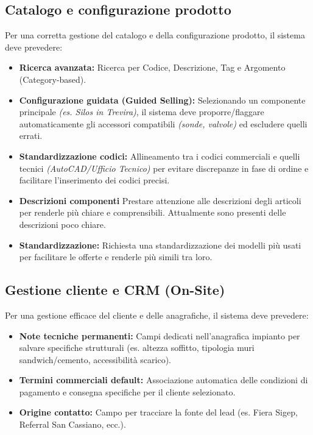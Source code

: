 \documentclass[12pt, a4paper]{article} %
\begin{document}
\subsection{Catalogo e configurazione prodotto}
Per una corretta gestione del catalogo e della configurazione prodotto, il sistema deve prevedere:
\begin{itemize}
      \item \textbf{Ricerca avanzata:} Ricerca per Codice, Descrizione, Tag e Argomento (Category-based).
      \item \textbf{Configurazione guidata (Guided Selling):} Selezionando un componente principale \textit{(es. Silos in Trevira)},
            il sistema deve proporre/flaggare automaticamente gli accessori compatibili \textit{(sonde, valvole)} ed escludere quelli errati.
      \item \textbf{Standardizzazione codici:} Allineamento tra i codici commerciali e quelli tecnici \textit{(AutoCAD/Ufficio Tecnico)}
            per evitare discrepanze in fase di ordine e facilitare l'inserimento dei codici precisi.
      \item \textbf{Descrizioni componenti} Prestare attenzione alle descrizioni degli articoli per renderle più chiare e comprensibili.
            Attualmente sono presenti delle descrizioni poco chiare.
      \item \textbf{Standardizzazione:} Richiesta una standardizzazione dei modelli più usati per facilitare le offerte e renderle più simili tra loro.
\end{itemize}

\subsection{Gestione cliente e CRM (On-Site)}
Per una gestione efficace del cliente e delle anagrafiche, il sistema deve prevedere:
\begin{itemize}
      \item \textbf{Note tecniche permanenti:} Campi dedicati nell'anagrafica impianto per salvare specifiche strutturali
            (es. altezza soffitto, tipologia muri sandwich/cemento, accessibilità scarico).
      \item \textbf{Termini commerciali default:} Associazione automatica delle condizioni di pagamento e consegna specifiche per il cliente selezionato.
      \item \textbf{Origine contatto:} Campo per tracciare la fonte del lead (es. Fiera Sigep, Referral San Cassiano, ecc.).
\end{itemize}
\end{document}
